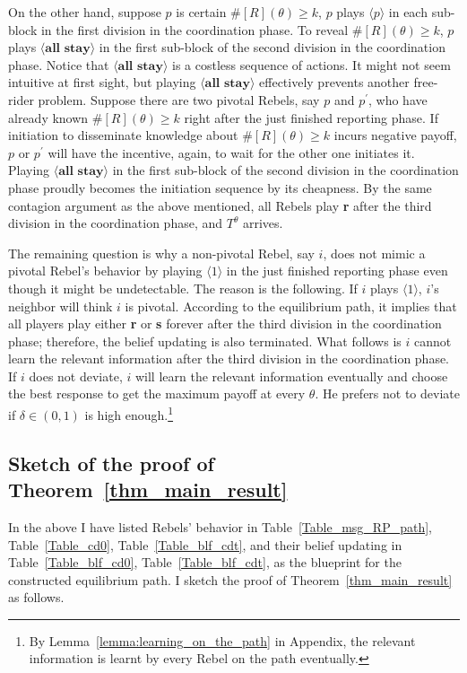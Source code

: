\documentclass[12pt,letter]{article}
\theoremstyle{definition}
\theoremstyle{remark}
\theoremstyle{claim}
\begin{document}
On the other hand, suppose $p$ is certain $\#[R](\theta)\geq k$, $p$ plays $\langle p \rangle$ in each sub-block in the first division in the coordination phase. To reveal $\#[R](\theta)\geq k$, $p$ plays $\langle \textbf{all stay} \rangle$ in the first sub-block of the second division in the coordination phase. Notice that $\langle \textbf{all stay} \rangle$ is a costless sequence of actions. It might not seem intuitive at first sight, but playing $\langle \textbf{all stay} \rangle$ effectively prevents another free-rider problem. Suppose there are two pivotal Rebels, say $p$ and $p^{'}$, who have already known $\#[R](\theta)\geq k$ right after the just finished reporting phase. If initiation to disseminate knowledge about $\#[R](\theta)\geq k$ incurs negative payoff, $p$ or $p^{'}$ will have the incentive, again, to wait for the other one initiates it. Playing $\langle \textbf{all stay} \rangle$ in the first sub-block of the second division in the coordination phase proudly becomes the initiation sequence by its cheapness. By the same contagion argument as the above mentioned, all Rebels play \textbf{r} after the third division in the coordination phase, and $T^{\theta}$ arrives.

The remaining question is why a non-pivotal Rebel, say $i$, does not mimic a pivotal Rebel's behavior by playing $\langle 1 \rangle$ in the just finished reporting phase even though it might be undetectable. The reason is the following. If $i$ plays $\langle 1 \rangle$, $i$'s neighbor will think $i$ is pivotal. According to the equilibrium path, it implies that all players play either \textbf{r} or \textbf{s} forever after the third division in the coordination phase; therefore, the belief updating is also terminated. What follows is $i$ cannot learn the relevant information after the third division in the coordination phase. If $i$ does not deviate, $i$ will learn the relevant information eventually and choose the best response to get the maximum payoff at every $\theta$. He prefers not to deviate if $\delta\in(0,1)$ is high enough.\footnote{By Lemma~\ref{lemma:learning_on_the_path} in Appendix, the relevant information is learnt by every Rebel on the path eventually.} 


\subsection{Sketch of the proof of Theorem~\ref{thm_main_result}}

In the above I have listed Rebels' behavior in Table~\ref{Table_msg_RP_path}, Table~\ref{Table_cd0}, Table~\ref{Table_blf_cdt}, and their belief updating in Table~\ref{Table_blf_cd0}, Table~\ref{Table_blf_cdt}, as the blueprint for the constructed equilibrium path. I sketch the proof of Theorem~\ref{thm_main_result} as follows.
\end{document}
